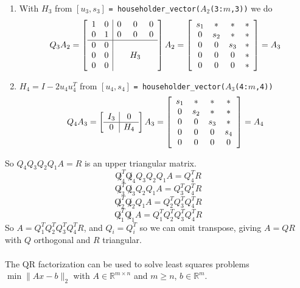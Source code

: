 \documentclass[10pt]{report}
\begin{document}
\begin{enumerate}
	\item With $H_3$ from $[u_3,s_3]$ \texttt{= householder\_vector($A_2$(3:$m$,3))} we do\
	$$Q_3A_2 = \left[\begin{array}{c c | c c c}
	1 & 0 & 0 & 0 & 0\\
	0 & 1 & 0 & 0 & 0\\
	\hline
	0 & 0 & \\
	0 & 0 & & H_3\\
	0 & 0 & \\
	\end{array}\right]A_2 = \left[\begin{array}{c c c c}
	s_1&*&*&*\\
	0&s_2&*&*\\
	0&0&s_3&*\\
	0&0&0&*\\
	0&0&0&*\\
	\end{array}\right] = A_3$$
	\item $H_4 = I - 2u_4u_4^T$ from $[u_4,s_4]$ \texttt{= householder\_vector($A_3$(4:$m$,4))}
	$$Q_4A_3 = \left[\begin{array}{c | c}
	I_3 & 0\\
	\hline
	0 & H_4
	\end{array}\right]A_3 = \left[\begin{array}{c c c c}
	s_1&*&*&*\\
	0&s_2&*&*\\
	0&0&s_3&*\\
	0&0&0&s_4\\
	0&0&0&0\\
	\end{array}\right] = A_4$$
\end{enumerate}
So $Q_4Q_3Q_2Q_1A = R$ is an upper triangular matrix.
$$\not Q_4^T\not Q_4Q_3Q_2Q_1A = Q_4^TR$$
$$\not Q_3^T\not Q_3Q_2Q_1A = Q_3^TQ_4^TR$$
$$\not Q_2^T\not Q_2Q_1A = Q_2^TQ_3^TQ_4^TR$$
$$\not Q_1^T\not Q_1A = Q_1^TQ_2^TQ_3^TQ_4^TR$$
So $A = Q_1^TQ_2^TQ_3^TQ_4^T R$, and $Q_i = Q_i^T$ so we can omit transpose, giving $A = QR$ with $Q$ orthogonal and $R$ triangular.\\\\
The QR factorization can be used to solve least squares problems $\min \|Ax-b\|_2$ with $A\in \mathbb{R}^{m\times n}$ and $m\geq n$, $b\in \mathbb{R}^m$.
\end{document}
